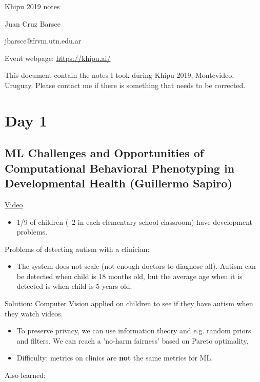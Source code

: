 \documentclass[12pt, english]{article}
\begin{document}
Khipu 2019 notes

Juan Cruz Barsce

jbarsce@frvm.utn.edu.ar

Event webpage: \url{https://khipu.ai/}

This document contain the notes I took during Khipu 2019, Montevideo, Uruguay. Please contact me if there is something that needs to be corrected.

\tableofcontents

\newpage

\section{Day 1}

\subsection{ML Challenges and Opportunities of Computational Behavioral Phenotyping in Developmental Health (Guillermo Sapiro)}

\href{http://tv.vera.com.uy/video/54702}{Video}

\begin{itemize}
\item 1/9 of children (~2 in each elementary school classroom) have development problems.
\end{itemize}

Problems of detecting autism with a clinician:
\begin{itemize}
\item The system does not scale (not enough doctors to diagnose all). Autism can be detected when child is 18 months old, but the average age when it is detected is when child is 5 years old.
\end{itemize}

Solution: Computer Vision applied on children to see if they have autism when they watch videos.
\begin{itemize}

\item To preserve privacy, we can use information theory and e.g. random priors and filters. We can reach a 'no-harm fairness' based on Pareto optimality.

\item Difficulty: metrics on clinics are \textbf{not} the same metrics for ML.

\end{itemize}

Also learned:
\end{document}

